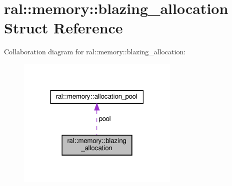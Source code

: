 \hypertarget{structral_1_1memory_1_1blazing__allocation}{}\section{ral\+:\+:memory\+:\+:blazing\+\_\+allocation Struct Reference}
\label{structral_1_1memory_1_1blazing__allocation}


Collaboration diagram for ral\+:\+:memory\+:\+:blazing\+\_\+allocation\+:\nopagebreak
\begin{figure}[H]
\begin{center}
\leavevmode
\includegraphics[width=219pt]{structral_1_1memory_1_1blazing__allocation__coll__graph}
\end{center}
\end{figure}
